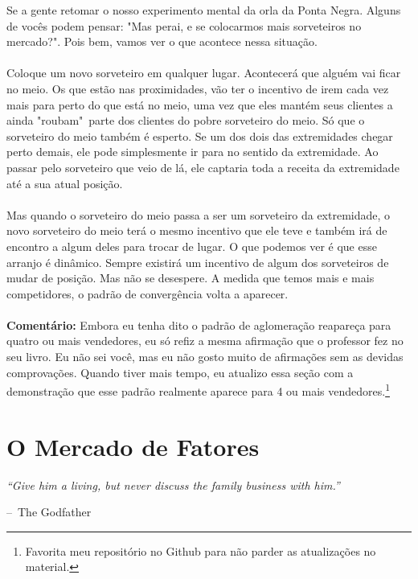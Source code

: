 \documentclass[a4paper,11pt,oneside]{book}
\makeatletter
\theoremstyle{definition}
\theoremstyle{break}
\newenvironment{chapquote}[2][2em]
  {\setlength{\@tempdima}{#1}%
   \def\chapquote@author{#2}%
   \parshape 1 \@tempdima \dimexpr\textwidth-2\@tempdima\relax%
   \itshape}
  {\par\normalfont\hfill--\ \chapquote@author\hspace*{\@tempdima}\par\bigskip}
\makeatother
\begin{document}
Se a gente retomar o nosso experimento mental da orla da Ponta Negra. Alguns de vocês podem pensar: "Mas perai, e se colocarmos mais sorveteiros no mercado?". Pois bem, vamos ver o que acontece nessa situação.
\\
\\
Coloque um novo sorveteiro em qualquer lugar. Acontecerá que alguém vai ficar no meio. Os que estão nas proximidades, vão ter o incentivo de irem cada vez mais para perto do que está no meio, uma vez que eles mantém seus clientes a ainda "roubam"\ parte dos clientes do pobre sorveteiro do meio. Só que o sorveteiro do meio também é esperto. Se um dos dois das extremidades chegar perto demais, ele pode simplesmente ir para no sentido da extremidade. Ao passar pelo sorveteiro que veio de lá, ele captaria toda a receita da extremidade até a sua atual posição.
\\
\\
Mas quando o sorveteiro do meio passa a ser um sorveteiro da extremidade, o novo sorveteiro do meio terá o mesmo incentivo que ele teve e também irá de encontro a algum deles para trocar de lugar. O que podemos ver é que esse arranjo é dinâmico. Sempre existirá um incentivo de algum dos sorveteiros de mudar de posição. Mas não se desespere. A medida que temos mais e mais competidores, o padrão de convergência volta a aparecer.
\\
\\
\textbf{Comentário:} Embora eu tenha dito o padrão de aglomeração reapareça para quatro ou mais vendedores, eu só refiz a mesma afirmação que o professor fez no seu livro. Eu não sei você, mas eu não gosto muito de afirmações sem as devidas comprovações. Quando tiver mais tempo, eu atualizo essa seção com a demonstração que esse padrão realmente aparece para 4 ou mais vendedores.\footnote{Favorita meu repositório no Github para não parder as atualizações no material.}

\chapter{O Mercado de Fatores}

\begin{chapquote}{The Godfather}
	``Give him a living, but never discuss the family business with him.''
\end{chapquote}
\end{document}
